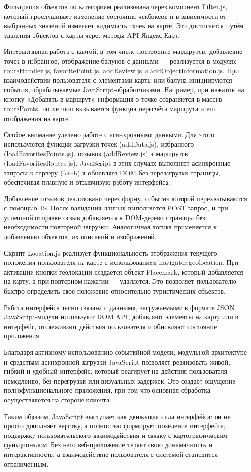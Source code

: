 Фильтрация объектов по категориям реализована через компонент Filter.js, который прослушивает изменение состояния чекбоксов и в зависимости от выбранных значений изменяет видимость точек на карте. Это достигается путём удаления объектов с карты через методы API Яндекс.Карт.

Интерактивная работа с картой, в том числе построение маршрутов, добавление точек в избранное, отображение балунов с данными — реализуется в модулях routeHandler.js, favoritePoint.js, addReview.js и addObjectInformation.js. При взаимодействии пользователя с элементами карты или балуна инициируются события, обрабатываемые JavaScript-обработчиками. Например, при нажатии на кнопку «Добавить в маршрут» информация о точке сохраняется в массив routePoints, после чего вызывается функция пересчёта маршрута и его отображения на карте.

Особое внимание уделено работе с асинхронными данными. Для этого используются функции загрузки точек (addData.js), избранного (loadFavoritesPoints.js), отзывов (addReview.js) и маршрутов (loadFavoritesRoutes.js). JavaScript в этих случаях выполняет асинхронные запросы к серверу (fetch) и обновляет DOM без перезагрузки страницы, обеспечивая плавную и отзывчивую работу интерфейса.

Добавление отзывов реализовано через форму, события которой перехватываются с помощью JS. После валидации данных выполняется POST-запрос, и при успешной отправке отзыв добавляется в DOM-дерево страницы без необходимости повторной загрузки. Аналогичная логика применяется к добавлению объектов, их описаний и изображений.

Скрипт Location.js реализует функциональность отображения текущего положения пользователя на карте с использованием navigator.geolocation. При активации кнопки геолокации создаётся объект Placemark, который добавляется на карту, а при повторном нажатии — удаляется. Это позволяет пользователю быстро определить своё положение относительно туристических объектов.

Работа интерфейса тесно связана с данными, загружаемыми в формате JSON. JavaScript-модули используют DOM API, добавляют элементы на карту или в интерфейс, отслеживают действия пользователя и обновляют состояние приложения.

Благодаря активному использованию событийной модели, модульной архитектуре и средствам асинхронной загрузки JavaScript позволяет реализовать живой, гибкий и удобный интерфейс, который реагирует на действия пользователя немедленно, без перегрузки или визуальных задержек. Это создаёт ощущение полнофункционального приложения, при том что основная обработка осуществляется на стороне клиента.

Таким образом, JavaScript выступает как движущая сила интерфейса: он не просто дополняет верстку, а полностью формирует поведение интерфейса, поддержку пользовательского взаимодействия и связку с картографическим функционалом. Без него веб-приложение теряет свою динамичность и интерактивность, а взаимодействие пользователя с системой становится ограниченным.